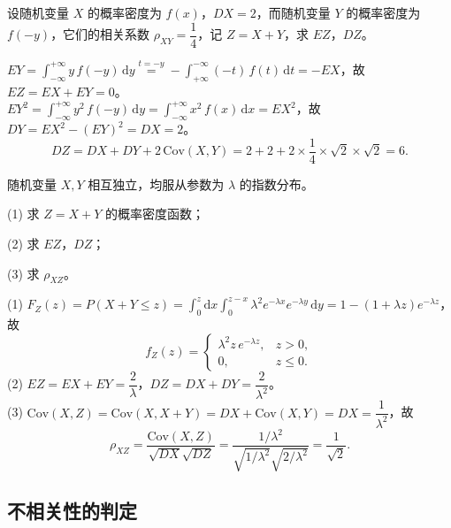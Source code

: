 \documentclass[lang=cn,11pt]{elegantbook}
\begin{document}
\begin{exercise}\label{exer:4-4-sym}
设随机变量 \(X\) 的概率密度为 \(f(x)\)，\(DX = 2\)，而随机变量 \(Y\) 的概率密度为 \(f(-y)\)，它们的相关系数 \(\rho_{XY} = \dfrac{1}{4}\)，记 \(Z = X + Y\)，求 \(EZ\)，\(DZ\)。
\end{exercise}
\begin{solution}
\(EY = \displaystyle\int_{-\infty}^{+\infty} y\,f(-y)\,\mathrm{d}y \stackrel{t=-y}{=} -\displaystyle\int_{+\infty}^{-\infty} (-t)\,f(t)\,\mathrm{d}t = -EX\)，故 \(EZ = EX + EY = 0\)。\\
\(EY^2 = \displaystyle\int_{-\infty}^{+\infty} y^2\,f(-y)\,\mathrm{d}y = \displaystyle\int_{-\infty}^{+\infty} x^2\,f(x)\,\mathrm{d}x = EX^2\)，故 \(DY = EX^2 - (EY)^2 = DX = 2\)。
\[
DZ = DX + DY + 2\,\mathrm{Cov}(X,Y) = 2 + 2 + 2 \times \frac{1}{4} \times \sqrt{2} \times \sqrt{2} = 6.
\]
\end{solution}

\begin{exercise}\label{exer:4-5-conv}
随机变量 \(X, Y\) 相互独立，均服从参数为 \(\lambda\) 的指数分布。\par
(1) 求 \(Z = X + Y\) 的概率密度函数；\par
(2) 求 \(EZ\)，\(DZ\)；\par
(3) 求 \(\rho_{XZ}\)。
\end{exercise}
\begin{solution}
(1) \(F_Z(z) = P(X+Y \leqslant z) = \displaystyle\int_0^z \mathrm{d}x \int_0^{z-x} \lambda^2 e^{-\lambda x} e^{-\lambda y}\,\mathrm{d}y = 1 - (1+\lambda z)e^{-\lambda z}\)，故
\[
f_Z(z) = \begin{cases} \lambda^2 z\,e^{-\lambda z}, & z > 0, \\[4pt] 0, & z \leqslant 0. \end{cases}
\]
(2) \(EZ = EX + EY = \dfrac{2}{\lambda}\)，\(DZ = DX + DY = \dfrac{2}{\lambda^2}\)。\\
(3) \(\mathrm{Cov}(X,Z) = \mathrm{Cov}(X, X+Y) = DX + \mathrm{Cov}(X,Y) = DX = \dfrac{1}{\lambda^2}\)，故
\[
\rho_{XZ} = \frac{\mathrm{Cov}(X,Z)}{\sqrt{DX}\sqrt{DZ}} = \frac{1/\lambda^2}{\sqrt{1/\lambda^2}\sqrt{2/\lambda^2}} = \frac{1}{\sqrt{2}}.
\]
\end{solution}


\subsection{不相关性的判定}

\end{document}
